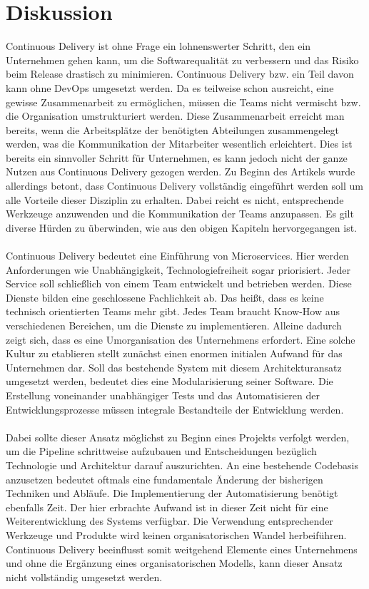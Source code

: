 \section{Diskussion}
Continuous Delivery ist ohne Frage ein lohnenswerter Schritt, den ein Unternehmen gehen kann, um die Softwarequalität zu verbessern und das Risiko beim Release drastisch zu minimieren. Continuous Delivery bzw. ein Teil davon kann ohne DevOps umgesetzt werden. Da es teilweise schon ausreicht, eine gewisse Zusammenarbeit zu ermöglichen, müssen die Teams nicht vermischt bzw. die Organisation umstrukturiert werden. Diese Zusammenarbeit erreicht man bereits, wenn die Arbeitsplätze der benötigten Abteilungen zusammengelegt werden, was die Kommunikation der Mitarbeiter wesentlich erleichtert. Dies ist bereits ein sinnvoller Schritt für Unternehmen, es kann jedoch nicht der ganze Nutzen aus Continuous Delivery gezogen werden. Zu Beginn des Artikels wurde allerdings betont, dass Continuous Delivery vollständig eingeführt werden soll um alle Vorteile dieser Disziplin zu erhalten. Dabei reicht es nicht, entsprechende Werkzeuge anzuwenden und die Kommunikation der Teams anzupassen. Es gilt diverse Hürden zu überwinden, wie aus den obigen Kapiteln hervorgegangen ist. \\ \\
Continuous Delivery bedeutet eine Einführung von Microservices. Hier werden Anforderungen wie Unabhängigkeit, Technologiefreiheit sogar priorisiert. Jeder Service soll schließlich von einem Team entwickelt und betrieben werden. Diese Dienste bilden eine geschlossene Fachlichkeit ab. Das heißt, dass es keine technisch orientierten Teams mehr gibt. Jedes Team braucht Know-How aus verschiedenen Bereichen, um die Dienste zu implementieren. Alleine dadurch zeigt sich, dass es eine Umorganisation des Unternehmens erfordert. Eine solche Kultur zu etablieren stellt zunächst einen enormen initialen Aufwand für das Unternehmen dar. Soll das bestehende System mit diesem Architekturansatz umgesetzt werden, bedeutet dies eine Modularisierung seiner Software. Die Erstellung voneinander unabhängiger Tests und das Automatisieren der Entwicklungsprozesse müssen integrale Bestandteile der Entwicklung werden. \\ \\
Dabei sollte dieser Ansatz möglichst zu Beginn eines Projekts verfolgt werden, um die Pipeline schrittweise aufzubauen und Entscheidungen bezüglich Technologie und Architektur darauf auszurichten. An eine bestehende Codebasis anzusetzen bedeutet oftmals eine fundamentale Änderung der bisherigen Techniken und Abläufe. Die Implementierung der Automatisierung benötigt ebenfalls Zeit. Der hier erbrachte Aufwand ist in dieser Zeit nicht für eine Weiterentwicklung des Systems verfügbar. Die Verwendung entsprechender Werkzeuge und Produkte wird keinen organisatorischen Wandel herbeiführen. Continuous Delivery beeinflusst somit weitgehend Elemente eines Unternehmens und ohne die Ergänzung eines organisatorischen Modells, kann dieser Ansatz nicht vollständig umgesetzt werden.\\ \\

